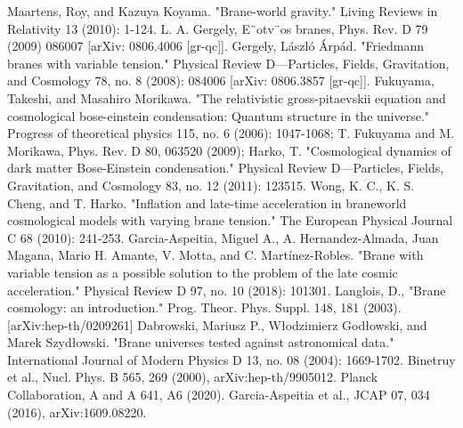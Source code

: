 \documentclass[12pt]{article}  %
\begin{document}
\begin{thebibliography}{99}
 Maartens, Roy, and Kazuya Koyama. "Brane-world gravity." Living Reviews in Relativity 13 (2010): 1-124.
 L. A. Gergely, E¨otv¨os branes, Phys. Rev. D 79 (2009) 086007 [arXiv: 0806.4006 [gr-qc]]. 
 Gergely, László Árpád. "Friedmann branes with variable tension." Physical Review D—Particles, Fields, Gravitation, and Cosmology 78, no. 8 (2008): 084006 [arXiv: 0806.3857 [gr-qc]].
Fukuyama, Takeshi, and Masahiro Morikawa. "The relativistic gross-pitaevskii equation and cosmological bose-einstein condensation: Quantum structure in the universe." Progress of theoretical physics 115, no. 6 (2006): 1047-1068; T. Fukuyama and M. Morikawa, Phys. Rev. D 80, 063520 (2009); Harko, T. "Cosmological dynamics of dark matter Bose-Einstein condensation." Physical Review D—Particles, Fields, Gravitation, and Cosmology 83, no. 12 (2011): 123515.
Wong, K. C., K. S. Cheng, and T. Harko. "Inflation and late-time acceleration in braneworld cosmological models with varying brane tension." The European Physical Journal C 68 (2010): 241-253.
Garcia-Aspeitia, Miguel A., A. Hernandez-Almada, Juan Magana, Mario H. Amante, V. Motta, and C. Martínez-Robles. "Brane with variable tension as a possible solution to the problem of the late cosmic acceleration." Physical Review D 97, no. 10 (2018): 101301.
 Langlois, D., "Brane cosmology: an introduction." Prog. Theor. Phys. Suppl. 148, 181 (2003). [arXiv:hep-th/0209261]
 Dabrowski, Mariusz P., Włodzimierz Godłowski, and Marek Szydłowski. "Brane universes tested against astronomical data." International Journal of Modern Physics D 13, no. 08 (2004): 1669-1702.
Binetruy et al., Nucl. Phys. B 565, 269 (2000), arXiv:hep-th/9905012.
Planck Collaboration, A and A 641, A6 (2020).
Garcia-Aspeitia et al., JCAP 07, 034 (2016), arXiv:1609.08220.


\end{thebibliography}
\end{document}
